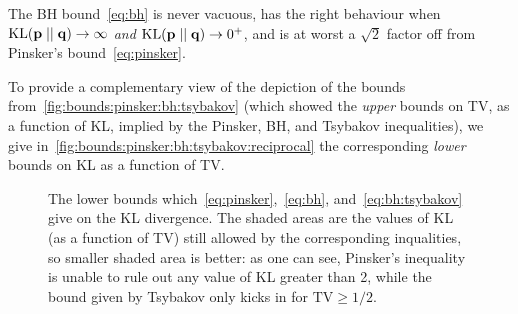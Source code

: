 \documentclass[10pt]{article}
\begin{document}
\begin{framed}
\noindent The BH bound~\eqref{eq:bh} is never vacuous, has the right behaviour when $\kldiv{\p}{\q}\to\infty$ \emph{and} $\kldiv{\p}{\q}\to 0^+$, and is at worst a $\sqrt{2}$ factor off from Pinsker's bound~\eqref{eq:pinsker}.
\end{framed}
To provide a complementary view of the depiction of the bounds from~\autoref{fig:bounds:pinsker:bh:tsybakov} (which showed the \emph{upper} bounds on TV, as a function of KL, implied by the Pinsker, BH, and Tsybakov inequalities), we give in~\autoref{fig:bounds:pinsker:bh:tsybakov:reciprocal} the corresponding \emph{lower} bounds on KL as a function of TV.

\begin{figure}[ht!]\centering
{} 
\caption{\label{fig:bounds:pinsker:bh:tsybakov:reciprocal}The lower bounds which~\eqref{eq:pinsker},~\eqref{eq:bh}, and~\eqref{eq:bh:tsybakov} give on the KL divergence. The shaded areas are the values of KL (as a function of TV) still allowed by the corresponding inqualities, so smaller shaded area is better: as one can see, Pinsker's inequality is unable to rule out any value of KL greater than 2, while the bound given by Tsybakov only kicks in for $\text{TV}\geq 1/2$.}
\end{figure}
\end{document}
